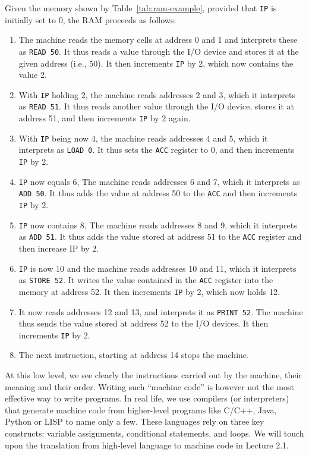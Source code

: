 \documentclass {aldast}
\begin{document}
Given the memory shown by Table~\ref{tab:ram-example}, provided that
\texttt{IP} is initially set to 0, the RAM proceeds as follows:
\begin{enumerate}
\item The machine reads the memory cells at address 0 and 1 and
  interprets these as \texttt{READ 50}. It thus reads a value through
  the I/O device and stores it at the given address (i.e., 50). It
  then increments \texttt{IP} by 2, which now contains the value 2.
\item With \texttt{IP} holding 2, the machine reads addresses 2 and
  3, which it interprets as \texttt{READ 51}. It thus reads another
  value through the I/O device, stores it at address 51, and then
  increments \texttt{IP} by 2 again.
\item With \texttt{IP} being now 4, the machine reads addresses 4 and
  5, which it interprets as \texttt{LOAD 0}. It thus sets the
  \texttt{ACC} register to 0, and then increments \texttt{IP} by 2.
\item \texttt{IP} now equals 6, The machine reads addresses 6 and
  7, which it interprets as \texttt{ADD 50}. It thus adds the value at
  address 50 to the \texttt{ACC} and then increments \texttt{IP} by 2.
\item \texttt{IP} now contains 8. The machine reads addresses 8 and 9,
  which it interprets as \texttt{ADD 51}. It thus adds the value
  stored at address 51 to the \texttt{ACC} register and then increase
  IP by 2.
\item \texttt{IP} is now 10 and the machine reads addresses 10 and 11,
  which it interprets as \texttt{STORE 52}. It writes the value
  contained in the \texttt{ACC} register into the memory at address
  52. It then increments \texttt{IP} by 2, which now holds 12.
\item It now reads addresses 12 and 13, and interprets it as
  \texttt{PRINT 52}. The machine thus sends the value stored at
  address 52 to the I/O devices. It then increments \texttt{IP} by 2.
\item The next instruction, starting at address 14 stops the machine.
\end{enumerate}

At this low level, we see clearly the instructions carried out by the
machine, their meaning and their order. Writing such ``machine code''
is however not the most effective way to write programs. In real life,
we use compilers (or interpreters) that generate machine code from
higher-level programs like C/C++, Java, Python or LISP to name only a
few. These languages rely on three key constructs:
variable assignments, conditional statements, and loops. We will touch
upon the translation from high-level language to machine code in
Lecture 2.1.
\end{document}
